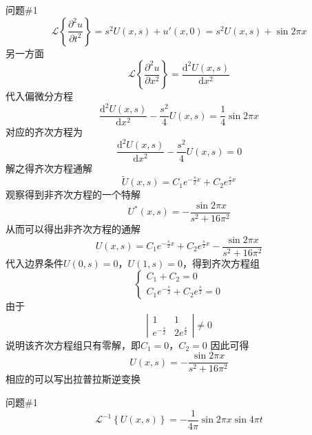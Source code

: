 \documentclass[12pt]{ctexart}
\begin{document}
    \begin{problem}{问题\#1}
        $$
        \mathscr{L}\left\{\dfrac{\partial^2u}{\partial t^2}\right\}=s^2U(x,s)+u'(x,0)=s^2U(x,s)+\sin2\pi x
        $$
        另一方面
        $$
        \mathscr{L}\left\{\dfrac{\partial^2u}{\partial x^2}\right\}=\dfrac{\mathrm{d}^2U(x,s)}{\mathrm{d}x^2}
        $$
        代入偏微分方程
        $$
        \dfrac{\mathrm{d}^2U(x,s)}{\mathrm{d}x^2}-\dfrac{s^2}{4}U(x,s)=\dfrac{1}{4}\sin2\pi x
        $$
        对应的齐次方程为
        $$
        \dfrac{\mathrm{d}^2U(x,s)}{\mathrm{d}x^2}-\dfrac{s^2}{4}U(x,s)=0
        $$
        解之得齐次方程通解
        $$
        \widetilde{U}(x,s)=C_1e^{-\frac{s}{2}x}+C_2e^{\frac{s}{2}x}
        $$
        观察得到非齐次方程的一个特解
        $$
        U^\ast(x,s)=-\dfrac{\sin2\pi x}{s^2+16\pi^2}
        $$
        从而可以得出非齐次方程的通解
        $$
        U(x,s)=C_1e^{-\frac{s}{2}x}+C_2e^{\frac{s}{2}x}-\dfrac{\sin2\pi x}{s^2+16\pi^2}
        $$
        代入边界条件$U(0,s)=0$，$U(1,s)=0$，得到齐次方程组
        $$
        \begin{cases}
            C_1+C_2=0\\
            C_1e^{-\frac{s}{2}}+C_2e^{\frac{s}{2}}=0
        \end{cases}
        $$
        由于$$
        \left|
        \begin{array}{cc}
            1 & 1 \\
            e^{-\frac{s}{2}} & 2e^{\frac{s}{2}}
        \end{array}
        \right|\neq0
        $$
        说明该齐次方程组只有零解，即$C_1=0$，$C_2=0$
        因此可得
        $$
        U(x,s)=-\dfrac{\sin2\pi x}{s^2+16\pi^2}
        $$
        相应的可以写出拉普拉斯逆变换
    \end{problem}
    \begin{problem}{问题\#1}
        $$
        \mathscr{L}^{-1}\left\{U(x,s)\right\}=-\dfrac{1}{4\pi}\sin2\pi x\sin4\pi t
        $$
    \end{problem}
\end{document}
